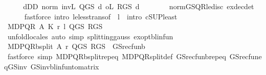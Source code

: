 \begin{isabellebody}
%
\isadelimproof
%
\endisadelimproof
%
\isatagproof
{}\isamarkupfalse%
\ {\isacharminus}{\kern0pt}\isanewline
\ \ \isamarkupfalse%
\ {\isachardoublequoteopen}{\isacharparenleft}{\kern0pt}{\isasymSqunion}d{\isasymin}D\isactrlsub D{\isachardot}{\kern0pt}\ norm\ {\isacharparenleft}{\kern0pt}inv\isactrlsub L\ {\isacharparenleft}{\kern0pt}Q{\isacharunderscore}{\kern0pt}GS\ d{\isacharparenright}{\kern0pt}\ o\isactrlsub L\ R{\isacharunderscore}{\kern0pt}GS\ d{\isacharparenright}{\kern0pt}{\isacharparenright}{\kern0pt}\ {\isacharless}{\kern0pt}\ {}{\isachardoublequoteclose}\isanewline
\ \ \ \ \isamarkupfalse%
\ norm{\isacharunderscore}{\kern0pt}GS{\isacharunderscore}{\kern0pt}QR{\isacharunderscore}{\kern0pt}le{\isacharunderscore}{\kern0pt}disc\ ex{\isacharunderscore}{\kern0pt}dec{\isacharunderscore}{\kern0pt}det\isanewline
\ \ \ \ \isamarkupfalse%
\ {\isacharparenleft}{\kern0pt}fastforce\ intro{\isacharcolon}{\kern0pt}\ le{\isacharunderscore}{\kern0pt}less{\isacharunderscore}{\kern0pt}trans{\isacharbrackleft}{\kern0pt}of\ {\isacharunderscore}{\kern0pt}\ l\ {}{\isacharbrackright}{\kern0pt}\ intro{\isacharbang}{\kern0pt}{\isacharcolon}{\kern0pt}\ cSUP{\isacharunderscore}{\kern0pt}least{\isacharparenright}{\kern0pt}\isanewline
\ \ \isamarkupfalse%
\ {\isachardoublequoteopen}MDP{\isacharunderscore}{\kern0pt}QR\ A\ K\ r\ l\ Q{\isacharunderscore}{\kern0pt}GS\ R{\isacharunderscore}{\kern0pt}GS{\isachardoublequoteclose}\isanewline
\ \ \ \ \isamarkupfalse%
\ unfold{\isacharunderscore}{\kern0pt}locales\ {\isacharparenleft}{\kern0pt}auto\ simp{\isacharcolon}{\kern0pt}\ splitting{\isacharunderscore}{\kern0pt}gauss\ ex{\isacharunderscore}{\kern0pt}opt{\isacharunderscore}{\kern0pt}blinfun{\isacharparenright}{\kern0pt}\isanewline
\ \ \isamarkupfalse%
\ {\isachardoublequoteopen}MDP{\isacharunderscore}{\kern0pt}QR{\isachardot}{\kern0pt}{\isasymL}\isactrlsub b{\isacharunderscore}{\kern0pt}split\ A\ r\ Q{\isacharunderscore}{\kern0pt}GS\ R{\isacharunderscore}{\kern0pt}GS\ {\isacharequal}{\kern0pt}\ GS{\isacharunderscore}{\kern0pt}rec{\isacharunderscore}{\kern0pt}fun\isactrlsub b{\isachardoublequoteclose}\isanewline
\ \ \ \ \isamarkupfalse%
\ {\isacharparenleft}{\kern0pt}fastforce\ simp{\isacharcolon}{\kern0pt}\ MDP{\isacharunderscore}{\kern0pt}QR{\isachardot}{\kern0pt}{\isasymL}\isactrlsub b{\isacharunderscore}{\kern0pt}split{\isachardot}{\kern0pt}rep{\isacharunderscore}{\kern0pt}eq\ MDP{\isacharunderscore}{\kern0pt}QR{\isachardot}{\kern0pt}{\isasymL}{\isacharunderscore}{\kern0pt}split{\isacharunderscore}{\kern0pt}def\ GS{\isacharunderscore}{\kern0pt}rec{\isacharunderscore}{\kern0pt}fun\isactrlsub b{\isachardot}{\kern0pt}rep{\isacharunderscore}{\kern0pt}eq\ GS{\isacharunderscore}{\kern0pt}rec{\isacharunderscore}{\kern0pt}fun{\isacharunderscore}{\kern0pt}eq{\isacharunderscore}{\kern0pt}GS{\isacharunderscore}{\kern0pt}inv\ GS{\isacharunderscore}{\kern0pt}inv{\isacharunderscore}{\kern0pt}blinfun{\isacharunderscore}{\kern0pt}to{\isacharunderscore}{\kern0pt}matrix{\isacharparenright}{\kern0pt}\isanewline

\end{isabellebody}
